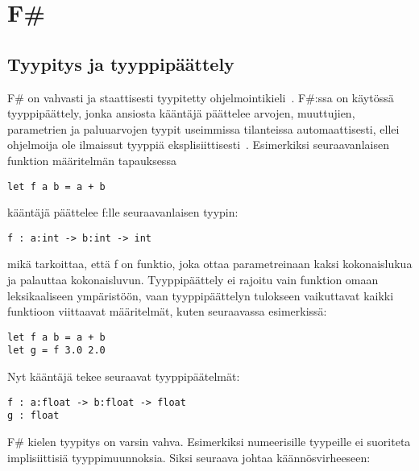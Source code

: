 
\lstset{
	language=FSharp,
	basicstyle=\ttfamily,
	breaklines=true,
	columns=fullflexible
}

\section{F\#}

\subsection{Tyypitys ja tyyppipäättely}

F\# on vahvasti ja staattisesti tyypitetty ohjelmointikieli~\cite{wiki_fs_programming}. F\#:ssa on käytössä tyyppipäättely, jonka ansiosta kääntäjä päättelee arvojen, muuttujien, parametrien ja paluuarvojen tyypit useimmissa tilanteissa automaattisesti, ellei ohjelmoija ole ilmaissut tyyppiä eksplisiittisesti~\cite{msn_type_inference}. Esimerkiksi seuraavanlaisen funktion määritelmän tapauksessa

\begin{lstlisting}
let f a b = a + b
\end{lstlisting}

kääntäjä päättelee f:lle seuraavanlaisen tyypin:

\begin{lstlisting}
f : a:int -> b:int -> int
\end{lstlisting}

mikä tarkoittaa, että f on funktio, joka ottaa parametreinaan kaksi kokonaislukua ja palauttaa kokonaisluvun. Tyyppipäättely ei rajoitu vain funktion omaan leksikaaliseen ympäristöön, vaan tyyppipäättelyn tulokseen vaikuttavat kaikki funktioon viittaavat määritelmät, kuten seuraavassa esimerkissä:

\begin{lstlisting}
let f a b = a + b
let g = f 3.0 2.0
\end{lstlisting}

Nyt kääntäjä tekee seuraavat tyyppipäätelmät:

\begin{lstlisting}
f : a:float -> b:float -> float
g : float
\end{lstlisting}

F\# kielen tyypitys on varsin vahva. Esimerkiksi numeerisille tyypeille ei suoriteta implisiittisiä tyyppimuunnoksia. Siksi seuraava johtaa käännösvirheeseen: 

